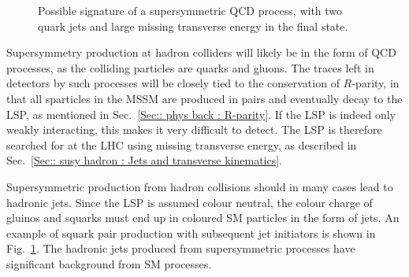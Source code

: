 \documentclass[twoside,english]{uiofysmaster}
\begin{document}
{\begin{figure}[H]
\centering
{}
\caption{Possible signature of a supersymmetric QCD process, with two quark jets and large missing transverse energy in the final state.}
\label{Fig:: susy hadron : decay at ATLAS}
\end{figure}


Supersymmetry production at hadron colliders will likely be in the form of QCD processes, as the colliding particles are quarks and gluons. The traces left in detectors by such processes will be closely tied to the conservation of $R$-parity, in that all sparticles in the MSSM are produced in pairs and eventually decay to the LSP, as mentioned in Sec.~\ref{Sec:: phys back : R-parity}. If the LSP is indeed only weakly interacting, this makes it very difficult to detect. The LSP is therefore searched for at the LHC using missing transverse energy, as described in Sec.~\ref{Sec:: susy hadron : Jets and transverse kinematics}.

Supersymmetric production from hadron collisions should in many cases lead to hadronic jets. Since the LSP is assumed colour neutral, the colour charge of gluinos and squarks must end up in coloured SM particles in the form of jets. An example of squark pair production with subsequent jet initiators is shown in Fig.~\ref{Fig:: susy hadron : decay at ATLAS}. The hadronic jets produced from supersymmetric processes have significant background from SM processes. 

}
\end{document}
